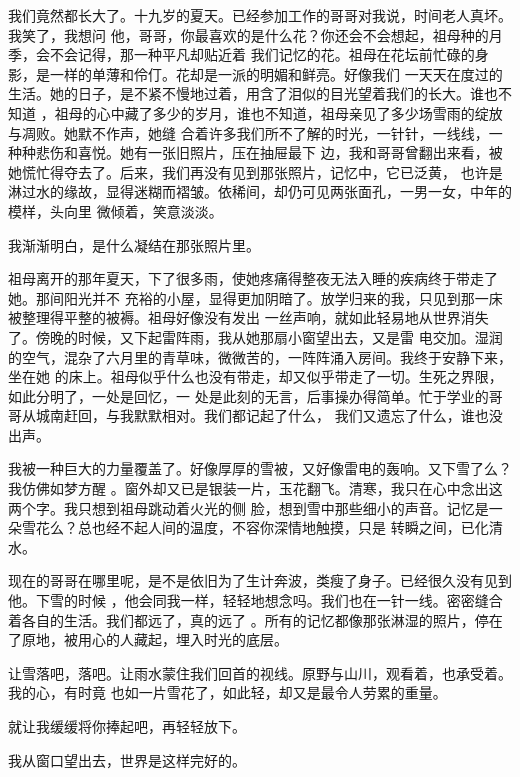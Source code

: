 \documentclass[12pt,a4paper]{article}
\begin{document}
		我们竟然都长大了。十九岁的夏天。已经参加工作的哥哥对我说，时间老人真坏。我笑了，我想问
	他，哥哥，你最喜欢的是什么花？你还会不会想起，祖母种的月季，会不会记得，那一种平凡却贴近着
	我们记忆的花。祖母在花坛前忙碌的身影，是一样的单薄和伶仃。花却是一派的明媚和鲜亮。好像我们
	一天天在度过的生活。她的日子，是不紧不慢地过着，用含了泪似的目光望着我们的长大。谁也不知道
	，祖母的心中藏了多少的岁月，谁也不知道，祖母亲见了多少场雪雨的绽放与凋败。她默不作声，她缝
	合着许多我们所不了解的时光，一针针，一线线，一种种悲伤和喜悦。她有一张旧照片，压在抽屉最下
	边，我和哥哥曾翻出来看，被她慌忙得夺去了。后来，我们再没有见到那张照片，记忆中，它已泛黄，
	也许是淋过水的缘故，显得迷糊而褶皱。依稀间，却仍可见两张面孔，一男一女，中年的模样，头向里
	微倾着，笑意淡淡。

		我渐渐明白，是什么凝结在那张照片里。

		祖母离开的那年夏天，下了很多雨，使她疼痛得整夜无法入睡的疾病终于带走了她。那间阳光并不
	充裕的小屋，显得更加阴暗了。放学归来的我，只见到那一床被整理得平整的被褥。祖母好像没有发出
	一丝声响，就如此轻易地从世界消失了。傍晚的时候，又下起雷阵雨，我从她那扇小窗望出去，又是雷
	电交加。湿润的空气，混杂了六月里的青草味，微微苦的，一阵阵涌入房间。我终于安静下来，坐在她
	的床上。祖母似乎什么也没有带走，却又似乎带走了一切。生死之界限，如此分明了，一处是回忆，一
	处是此刻的无言，后事操办得简单。忙于学业的哥哥从城南赶回，与我默默相对。我们都记起了什么，
	我们又遗忘了什么，谁也没出声。

		我被一种巨大的力量覆盖了。好像厚厚的雪被，又好像雷电的轰响。又下雪了么？我仿佛如梦方醒
	。窗外却又已是银装一片，玉花翻飞。清寒，我只在心中念出这两个字。我只想到祖母跳动着火光的侧
	脸，想到雪中那些细小的声音。记忆是一朵雪花么？总也经不起人间的温度，不容你深情地触摸，只是
	转瞬之间，已化清水。

		现在的哥哥在哪里呢，是不是依旧为了生计奔波，类瘦了身子。已经很久没有见到他。下雪的时候
	，他会同我一样，轻轻地想念吗。我们也在一针一线。密密缝合着各自的生活。我们都远了，真的远了
	。所有的记忆都像那张淋湿的照片，停在了原地，被用心的人藏起，埋入时光的底层。

		让雪落吧，落吧。让雨水蒙住我们回首的视线。原野与山川，观看着，也承受着。我的心，有时竟
	也如一片雪花了，如此轻，却又是最令人劳累的重量。

		就让我缓缓将你捧起吧，再轻轻放下。

		我从窗口望出去，世界是这样完好的。

	\endwriting

	\iffalse %
	\writing{雷}{2005年08月19日 ~ 09:50:52}
	\endwriting
	\fi %
\end{document}
